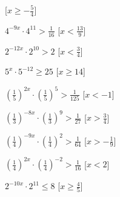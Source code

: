 \begin{esercizio}
\begin{enumeratea}
\)
   \hfill [\(x \geqslant -\frac{5}{4}\)]
  \item  \(4^{-9x} \cdot 4^{11} > \frac{1}{16}\)
   \hfill [\(x < \frac{13}{9}\)]
  \item  \(2^{-12x} \cdot 2^{10} > 2\)
   \hfill [\(x < \frac{3}{4}\)]
  \item  \(5^{x} \cdot 5^{-12} \geqslant 25\)
   \hfill [\(x \geqslant 14\)]
  \item  \(\left(\frac{1}{5}\right)^{2x} \cdot \left(\frac{1}{5}\right)^{5} > 
\frac{1}{125}\)
   \hfill [\(x < -1\)]
  \item  \(\left(\frac{1}{3}\right)^{-8x} \cdot \left(\frac{1}{3}\right)^{9} > 
\frac{1}{27}\)
   \hfill [\(x > \frac{3}{4}\)]
  \item  \(\left(\frac{1}{4}\right)^{-9x} \cdot \left(\frac{1}{4}\right)^{2} > 
\frac{1}{64}\)
   \hfill [\(x > -\frac{1}{9}\)]
  \item  \(\left(\frac{1}{4}\right)^{2x} \cdot \left(\frac{1}{4}\right)^{-2} > 
\frac{1}{16}\)
   \hfill [\(x < 2\)]
  \item  \(2^{-10x} \cdot 2^{11} \leqslant 8\)
   \hfill [\(x \geqslant \frac{4}{5}\)]
 \end{enumeratea}
\end{esercizio}


